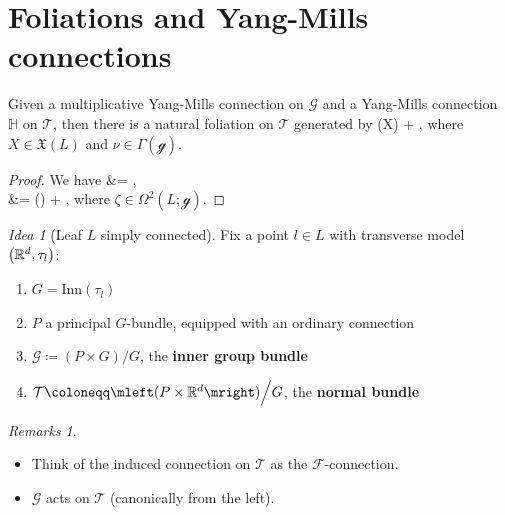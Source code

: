 \documentclass[
aspectratio=3218, 
10pt
]{beamer}
\def\bas#1\eas{\begin{align*}#1\end{align*}}
\theoremstyle{plain}
\theoremstyle{remark}
\newtheorem*{remark}{Remarks}
\newtheorem*{idea}{Idea}
\begin{document}


\section{Foliations and Yang-Mills connections}
{

\begin{frame}
\begin{theorem}[{[C.\ L.-G., S.-R.\ F.]}]\vspace{.5pt}
Given a multiplicative Yang-Mills connection on $\mathcal{G}$ and a Yang-Mills connection $\mathbb{H}$ on $\mathcal{T}$, then there is a natural foliation on $\mathcal{T}$ generated by 
\bas
\mathbb{H}(X) + \overline{\nu},
\eas
where $X \in \mathfrak{X}(L)$ and $\nu \in \Gamma(\mathcal{g})$.
\end{theorem}
\pause
\begin{proof}
We have
\bas
\mleft[ \mathbb{H}(X), \overline{\nu} \mright]
&=
,
\\
&=
\mleft(\mright)
	+ ,
\eas
where $\zeta \in \Omega^2(L; \mathcal{g})$.	
\end{proof}
\end{frame}

\begin{frame}
\begin{idea}[Leaf $L$ simply connected]
Fix a point $l \in L$ with transverse model $\mleft(\mathbb{R}^d, \tau_l\mright)$:
\begin{enumerate}
	\item $G = \mathrm{Inn}(\tau_l)$
	\pause
	\item $P$ a principal $G$-bundle, equipped with an ordinary connection
	\pause
	\item $\mathcal{G} \coloneqq (P \times G) \Big/ G$, the \textbf{inner group bundle}
	\pause
	\item $\mathcal{T} \coloneqq \mleft(P \times \mathbb{R}^d\mright) \Big/ G$, the \textbf{normal bundle}
\end{enumerate}
\end{idea}

\pause

\begin{remark}
\begin{itemize}
	\item Think of the induced connection on $\mathcal{T}$ as the $\mathcal{F}$-connection.
	\item $\mathcal{G}$ acts on $\mathcal{T}$ (canonically from the left).
\end{itemize}
\end{remark}


\end{frame}}
\end{document}
